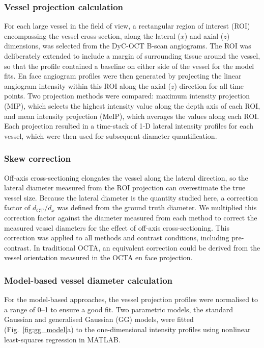 \documentclass{optica-article}
\begin{document}
\subsubsection{Vessel projection calculation}
\label{subsubsec:vessel_projection}
For each large vessel in the field of view, a rectangular region of interest (ROI) encompassing the vessel cross-section, along the lateral ($x$) and axial ($z$) dimensions, was selected from the DyC-OCT B-scan angiograms. The ROI was deliberately extended to include a margin of surrounding tissue around the vessel, so that the profile contained a baseline on either side of the vessel for the model fits. En face angiogram profiles were then generated by projecting the linear angiogram intensity within this ROI along the axial ($z$) direction for all time points. Two projection methods were compared: maximum intensity projection (MIP), which selects the highest intensity value along the depth axis of each ROI, and mean intensity projection (MeIP), which averages the values along each ROI. Each projection resulted in a time-stack of 1-D lateral intensity profiles for each vessel, which were then used for subsequent diameter quantification. 

\subsubsection{Skew correction}
\label{subsubsec:skew_correction}
Off-axis cross-sectioning elongates the vessel along the lateral direction, so the lateral diameter measured from the ROI projection can overestimate the true vessel size. Because the lateral diameter is the quantity studied here, a correction factor of $d_{\mathrm{GT}}/d_x$ was defined from the ground truth diameter. We multiplied this correction factor against the diameter measured from each method to correct the measured vessel diameters for the effect of off-axis cross-sectioning. This correction was applied to all methods and contrast conditions, including pre-contrast. In traditional OCTA, an equivalent correction could be derived from the vessel orientation measured in the OCTA en face projection.

\subsubsection{Model-based vessel diameter calculation}
\label{subsubsec:vessel_diameter}
For the model-based approaches, the vessel projection profiles were normalised to a range of 0--1 to ensure a good fit. Two parametric models, the standard Gaussian and generalised Gaussian (GG) models, were fitted (Fig.~\ref{fig:gg_model}a) to the one-dimensional intensity profiles using nonlinear least-squares regression in MATLAB.
\end{document}

